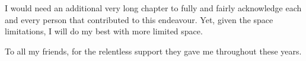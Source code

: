 
\begin{acknowledgements}      


I would need an additional very long chapter to fully and fairly acknowledge each and every person that contributed to this endeavour. Yet, given the space limitations, I will do my best with more limited space.

To all my friends, for the relentless support they gave me throughout these years. 


\end{acknowledgements}
